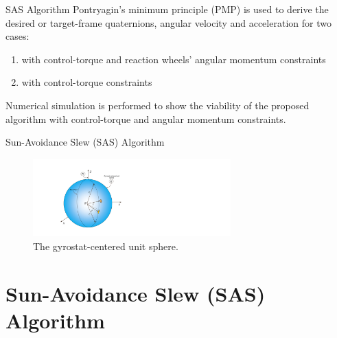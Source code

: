 \documentclass{beamer}
\begin{document}
\begin{frame}
\begin{block}{SAS Algorithm}	
	Pontryagin's minimum principle (PMP) is used to derive the desired or target-frame quaternions, angular velocity and acceleration for two cases: 
	\begin{enumerate}
		\item with control-torque and reaction wheels' angular momentum constraints
		\item with control-torque constraints
	\end{enumerate} 
	Numerical simulation is performed to show the viability of the proposed algorithm with control-torque and angular momentum constraints.
\end{block}
\end{frame}
\begin{frame}{Sun-Avoidance Slew (SAS) Algorithm}
\begin{block}{}
	\begin{figure}
		\includegraphics[width=3in]{./Figures/SASSchematic1}
		\caption{The gyrostat-centered unit sphere.}
	\end{figure}
\end{block}
\end{frame}
\section{Sun-Avoidance Slew (SAS) Algorithm}
\end{document}
